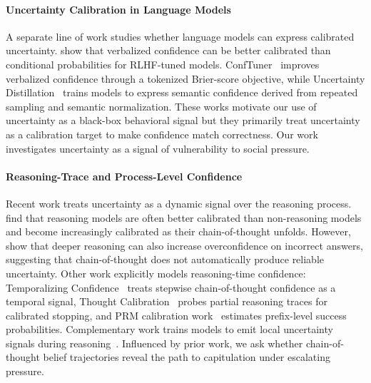 \paragraph{Uncertainty Calibration in Language Models}  A separate line of work studies whether language models can express calibrated uncertainty. \citet{tian2023justask} show that verbalized confidence can be better calibrated than conditional probabilities for RLHF-tuned models. ConfTuner~\citep{li2025conftuner} improves verbalized confidence through a tokenized Brier-score objective, while Uncertainty Distillation~\citep{hager2025uncertaintydistillationteachinglanguage} trains models to express semantic confidence derived from repeated sampling and semantic normalization. These works motivate our use of uncertainty as a black-box behavioral signal but they primarily treat uncertainty as a calibration target to make confidence match correctness. Our work investigates uncertainty as a signal of vulnerability to social pressure.

\paragraph{Reasoning-Trace and Process-Level Confidence} Recent work treats uncertainty as a dynamic signal over the reasoning process. \citet{yoon2025reasoningconfidence} find that reasoning models are often better calibrated than non-reasoning models and become increasingly calibrated as their chain-of-thought unfolds. However, \citet{mei2025reasoninguncertainty} show that deeper reasoning can also increase overconfidence on incorrect answers, suggesting that chain-of-thought does not automatically produce reliable uncertainty. Other work explicitly models reasoning-time confidence: Temporalizing Confidence~\citep{mao2025temporalizingconfidence} treats stepwise chain-of-thought confidence as a temporal signal, Thought Calibration~\citep{wu2025thoughtcalibration} probes partial reasoning traces for calibrated stopping, and PRM calibration work~\citep{park2025knowwhatyoudontknow} estimates prefix-level success probabilities. Complementary work trains models to emit local uncertainty
signals during reasoning~\citep{guo2026llmsshouldexpressuncertainty}. Influenced by prior work, we ask whether chain-of-thought belief trajectories reveal the path to capitulation under escalating pressure.

